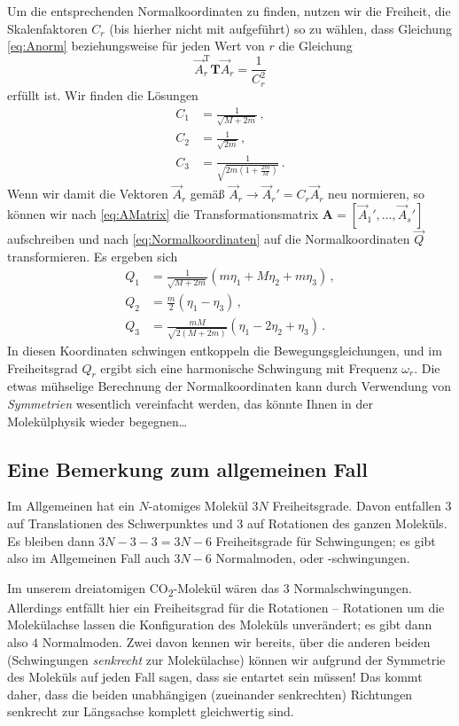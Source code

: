 \documentclass[paper=a4, fontsize=11.0pt, abstractoff, DIV12]{scrartcl}
\begin{document}
Um die entsprechenden Normalkoordinaten zu finden, nutzen wir die Freiheit, die
Skalenfaktoren $C_r$ (bis hierher nicht mit aufgeführt) so zu wählen, dass
Gleichung \eqref{eq:Anorm} beziehungsweise für jeden Wert von $r$ die Gleichung
\begin{equation}
\vec A_r^\mathrm{T}\mathbf{T}\vec A_r = \frac{1}{C_r^2}
\end{equation}
erfüllt ist. Wir finden die Lösungen
\begin{align}
C_1 &= \frac{1}{\sqrt{M+2m}}\,,\\
C_2 &= \frac{1}{\sqrt{2m}}\,,\\
C_3 &= \frac{1}{\sqrt{2m\left(1+\frac{2m}{M}\right)}}\,.
\end{align}
Wenn wir damit die Vektoren $\vec A_r$ gemäß $\vec A_r \to \vec A_r' = C_r
\vec A_r$ neu normieren, so können wir nach \eqref{eq:AMatrix} die
Transformationsmatrix $\mathbf A = [\vec A_1', \dots, \vec A_s']$
aufschreiben und nach \eqref{eq:Normalkoordinaten} auf die Normalkoordinaten
$\vec Q$ transformieren. Es
ergeben sich
\begin{align}
Q_1 &= \frac{1}{\sqrt{M+2m}}(m\eta_1 + M\eta_2 + m\eta_3)\,,\\
Q_2 &= \frac{m}{2}(\eta_1 - \eta_3)\,,\\
Q_3 &= \frac{mM}{\sqrt{2(M+2m)}}(\eta_1 - 2\eta_2 + \eta_3)\,.
\end{align}
In diesen Koordinaten schwingen entkoppeln die Bewegungsgleichungen, und im
Freiheitsgrad $Q_r$ ergibt sich eine harmonische Schwingung mit Frequenz
$\omega_r$. Die etwas mühselige Berechnung der Normalkoordinaten kann durch
Verwendung von \emph{Symmetrien} wesentlich vereinfacht werden, das könnte
Ihnen in der Molekülphysik wieder begegnen\dots

\subsection{Eine Bemerkung zum allgemeinen Fall}

Im Allgemeinen hat ein $N$-atomiges Molekül $3N$ Freiheitsgrade. Davon
entfallen $3$ auf Translationen des Schwerpunktes und $3$ auf Rotationen des
ganzen Moleküls. Es bleiben dann $3N - 3 - 3 = 3N-6$ Freiheitsgrade für
Schwingungen; es gibt also im Allgemeinen Fall auch $3N - 6$ Normalmoden,
oder -schwingungen.

Im unserem dreiatomigen CO\textsubscript{2}-Molekül wären das $3$
Normalschwingungen. Allerdings entfällt hier ein Freiheitsgrad für die
Rotationen -- Rotationen um die Molekülachse lassen die Konfiguration des
Moleküls unverändert; es gibt dann also $4$ Normalmoden. Zwei davon kennen
wir bereits, über die anderen beiden (Schwingungen \emph{senkrecht} zur
Molekülachse) können wir aufgrund der Symmetrie des Moleküls auf jeden Fall
sagen, dass sie entartet sein müssen! Das kommt daher, dass die beiden
unabhängigen (zueinander senkrechten) Richtungen senkrecht zur Längsachse
komplett gleichwertig sind.
\end{document}
